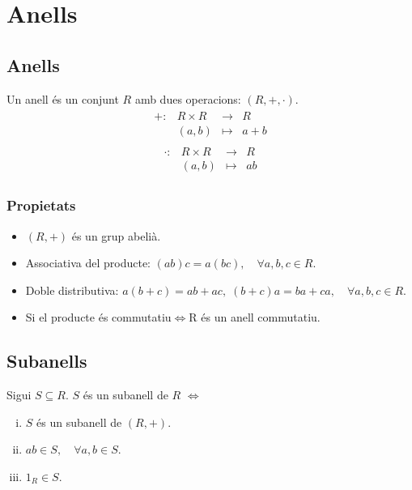 \section{Anells}
\subsection{Anells}
Un anell és un conjunt $R$ amb dues operacions: $(R,+, \cdot)$.
\begin{align}
    \begin{matrix}
        +: & R \times R & \to & R \\
        & (a,b) & \mapsto & a + b
    \end{matrix}
\end{align}
\begin{align}
    \begin{matrix}
        \cdot: & R \times R & \to & R \\
        & (a,b) & \mapsto & ab
    \end{matrix}
\end{align}

\subsubsection*{Propietats}
\begin{itemize}
    \item $(R,+)$ és un grup abelià.
    \item Associativa del producte: $(ab)c = a(bc), \quad \forall a,b,c \in R$.
    \item Doble distributiva: $a(b+c) = ab + ac, \;(b+c)a = ba + ca, \quad \forall a,b,c \in R$.
    \item Si el producte és commutatiu$\Leftrightarrow$R és un anell commutatiu.
\end{itemize}

\subsection{Subanells}
Sigui $S \subseteq R$. $S$ és un subanell de $R$ $\Leftrightarrow$
\begin{enumerate}[i)]
    \item $S$ és un subanell de $(R,+)$.
    \item $ab \in S, \quad \forall a,b \in S$.
    \item $1_{R} \in S$.
\end{enumerate}

